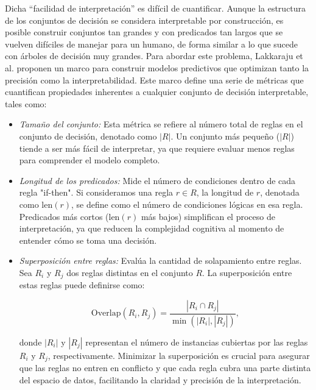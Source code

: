 Dicha “facilidad de interpretación” es difícil de cuantificar. Aunque la estructura de los conjuntos de decisión se considera interpretable por construcción, es posible construir conjuntos tan grandes y con predicados tan largos que se vuelven difíciles de manejar para un humano, de forma similar a lo que sucede con árboles de decisión muy grandes. Para abordar este problema, Lakkaraju et al. proponen un marco para construir modelos predictivos que optimizan tanto la precisión como la interpretabilidad. Este marco define una serie de métricas que cuantifican propiedades inherentes a cualquier conjunto de decisión interpretable, tales como:

\begin{itemize}
    \item \textit{Tamaño del conjunto:} Esta métrica se refiere al número total de reglas en el conjunto de decisión, denotado como \( |R| \). Un conjunto más pequeño (\( |R| \)) tiende a ser más fácil de interpretar, ya que requiere evaluar menos reglas para comprender el modelo completo.
    
    \item \textit{Longitud de los predicados:} Mide el número de condiciones dentro de cada regla "if-then". Si consideramos una regla \( r \in R \), la longitud de \( r \), denotada como \( \text{len}(r) \), se define como el número de condiciones lógicas en esa regla. Predicados más cortos (\( \text{len}(r) \) más bajos) simplifican el proceso de interpretación, ya que reducen la complejidad cognitiva al momento de entender cómo se toma una decisión.
    
    \item \textit{Superposición entre reglas:} Evalúa la cantidad de solapamiento entre reglas. Sea \( R_i \) y \( R_j \) dos reglas distintas en el conjunto \( R \). La superposición entre estas reglas puede definirse como:

\begin{equation}
\text{Overlap}(R_i, R_j) = \frac{|R_i \cap R_j|}{\min(|R_i|, |R_j|)},
\end{equation}

donde \( |R_i| \) y \( |R_j| \) representan el número de instancias cubiertas por las reglas \( R_i \) y \( R_j \), respectivamente. Minimizar la superposición es crucial para asegurar que las reglas no entren en conflicto y que cada regla cubra una parte distinta del espacio de datos, facilitando la claridad y precisión de la interpretación.

\end{itemize}

